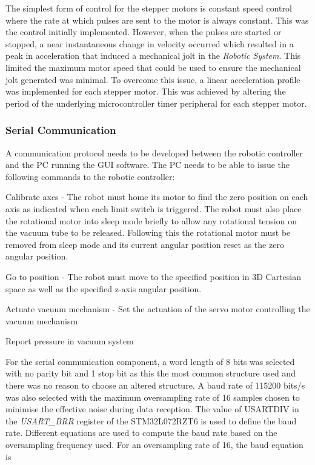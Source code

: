 The simplest form of control for the stepper motors is constant speed control where the rate at which pulses are sent to the motor is always constant. This was the control initially implemented. However, when the pulses are started or stopped, a near instantaneous change in velocity occurred which resulted in a peak in acceleration that induced a mechanical jolt in the \textit{Robotic System}. This limited the maximum motor speed that could be used to ensure the mechanical jolt generated was minimal. To overcome this issue, a linear acceleration profile was implemented for each stepper motor. This was achieved by altering the period of the underlying microcontroller timer peripheral for each stepper motor.

\subsubsection{Serial Communication} \label{sec:Serial Communication}

A communication protocol needs to be developed between the robotic controller and the PC running the GUI software. The PC needs to be able to issue the following commands to the robotic controller:

\begin{compactitem}
	\item Calibrate axes - The robot must home its motor to find the zero position on each axis as indicated when each limit switch is triggered. The robot must also place the rotational motor into sleep mode briefly to allow any rotational tension on the vacuum tube to be released. Following this the rotational motor must be removed from sleep mode and its current angular position reset as the zero angular position. 
	\item Go to position - The robot must move to the specified position in 3D Cartesian space as well as the specified z-axis angular position.
	\item Actuate vacuum mechanism - Set the actuation of the servo motor controlling the vacuum mechanism
	\item Report pressure in vacuum system
\end{compactitem}

For the serial communication component, a word length of 8 bits was selected with no parity bit and 1 stop bit as this the most common structure used and there was no reason to choose an altered structure. A baud rate of 115200 bits/s was also selected with the maximum oversampling rate of 16 samples chosen to minimise the effective noise during data reception. The value of USARTDIV in the \textit{USART\_BRR} register of the STM32L072RZT6 is used to define the baud rate. Different equations are used to compute the baud rate based on the oversampling frequency used. For an oversampling rate of 16, the baud equation is

